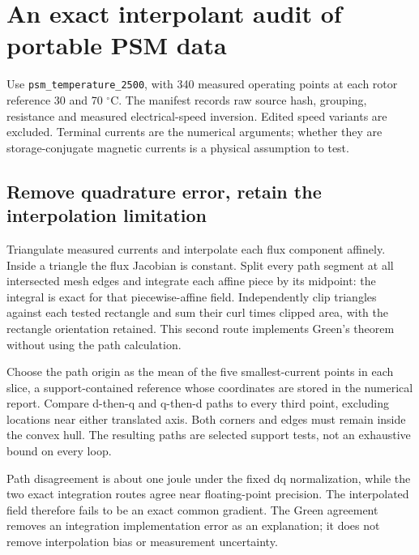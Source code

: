 \section{An exact interpolant audit of portable PSM data}
\label{sec:real-admissibility}
Use \texttt{psm\_temperature\_2500}, with 340 measured operating points at
each rotor reference 30 and 70 $^\circ$C. The manifest records raw source hash,
grouping, resistance and measured electrical-speed inversion. Edited speed
variants are excluded. Terminal currents are the numerical arguments; whether
they are storage-conjugate magnetic currents is a physical assumption to test.

\subsection{Remove quadrature error, retain the interpolation limitation}
Triangulate measured currents and interpolate each flux component affinely.
Inside a triangle the flux Jacobian is constant. Split every path segment at
all intersected mesh edges and integrate each affine piece by its midpoint:
the integral is exact for that piecewise-affine field. Independently clip
triangles against each tested rectangle and sum their curl times clipped area,
with the rectangle orientation retained. This second route implements Green's
theorem without using the path calculation.

Choose the path origin as the mean of the five smallest-current points in
each slice, a support-contained reference whose coordinates are stored in the
numerical report. Compare d-then-q and q-then-d paths to every third point,
excluding locations near either translated axis. Both corners and edges must
remain inside the convex hull. The resulting paths are selected support tests,
not an exhaustive bound on every loop.

\begin{table}[htbp]\centering\small

\caption{Exact P1 audit. Curl RMS is area-weighted in mH. Path RMS and the
maximum independent Green discrepancy are in normalized co-energy joules.}
\end{table}
Path disagreement is about one joule under the fixed dq normalization, while
the two exact integration routes agree near floating-point precision.
The interpolated field therefore fails to be an exact common gradient.
The Green agreement removes an integration implementation error as an
explanation; it does not remove interpolation bias or measurement uncertainty.

